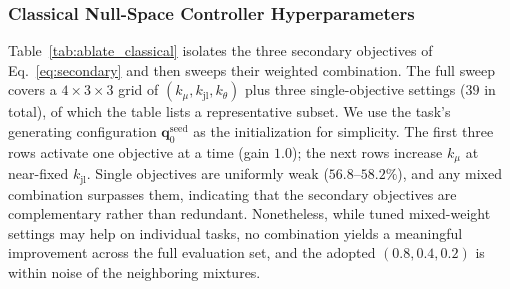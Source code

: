 \documentclass[journal, twoside]{IEEEtran}
\begin{document}
\subsubsection{Classical Null-Space Controller Hyperparameters}

Table~\ref{tab:ablate_classical} isolates the three secondary objectives of Eq.~\eqref{eq:secondary} and then sweeps their weighted combination.  The full sweep covers a $4\times3\times3$ grid of $(k_{\mu},k_{\mathrm{jl}},k_{\theta})$ plus three single-objective settings ($39$ in total), of which the table lists a representative subset. We use the task's generating configuration $\mathbf{q}_{0}^{\mathrm{seed}}$ as the initialization for simplicity. The first three rows activate one objective at a time (gain $1.0$); the next rows increase $k_{\mu}$ at near-fixed $k_{\mathrm{jl}}$. Single objectives are uniformly weak ($56.8$--$58.2\%$), and any mixed combination surpasses them, indicating that the secondary objectives are complementary rather than redundant. Nonetheless, while tuned mixed-weight settings may help on individual tasks, no combination yields a meaningful improvement across the full evaluation set, and the adopted $(0.8,0.4,0.2)$ is within noise of the neighboring mixtures.
\end{document}
